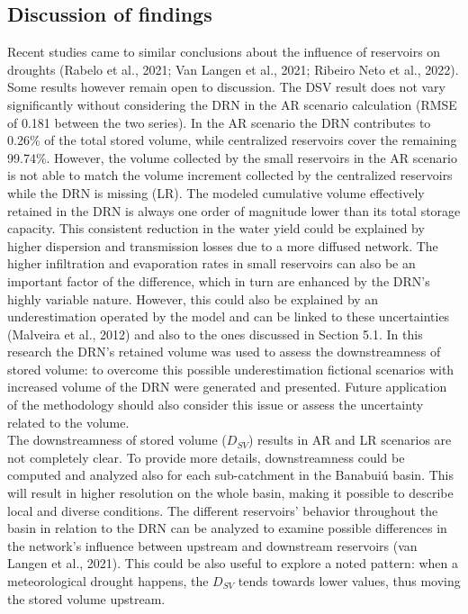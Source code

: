\documentclass[draft]{agujournal2019}
\begin{document}
\subsection{Discussion of findings}
Recent studies came to similar conclusions about the influence of reservoirs on droughts (Rabelo et al., 2021; Van Langen et al., 2021; Ribeiro Neto et al., 2022). Some results however remain open to discussion. The DSV result does not vary significantly without considering the DRN in the AR scenario calculation (RMSE of 0.181 between the two series). In the AR scenario the DRN contributes to 0.26\% of the total stored volume, while centralized reservoirs cover the remaining 99.74\%. However, the volume collected by the small reservoirs in the AR scenario is not able to match the volume increment collected by the centralized reservoirs while the DRN is missing (LR). The modeled cumulative volume effectively retained in the DRN is always one order of magnitude lower than its total storage capacity. This consistent reduction in the water yield could be explained by higher dispersion and transmission losses due to a more diffused network. The higher infiltration and evaporation rates in small reservoirs can also be an important factor of the difference, which in turn are enhanced by the DRN’s highly variable nature. However, this could also be explained by an underestimation operated by the model and can be linked to these uncertainties (Malveira et al., 2012) and also to the ones discussed in Section 5.1. In this research the DRN’s retained volume was used to assess the downstreamness of stored volume: to overcome this possible underestimation fictional scenarios with increased volume of the DRN were generated and presented. Future application of the methodology should also consider this issue or assess the uncertainty related to the volume.\\
The downstreamness of stored volume ($D_{SV}$) results in AR and LR scenarios are not completely clear. To provide more details, downstreamness could be computed and analyzed also for each sub-catchment in the Banabuiú basin. This will result in higher resolution on the whole basin, making it possible to describe local and diverse conditions. The different reservoirs’ behavior throughout the basin in relation to the DRN can be analyzed to examine possible differences in the network’s influence between upstream and downstream reservoirs (van Langen et al., 2021). This could be also useful to explore a noted pattern: when a meteorological drought happens, the $D_{SV}$ tends towards lower values, thus moving the stored volume upstream.
\end{document}
